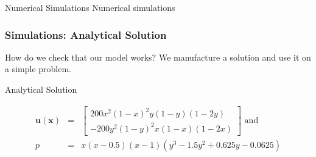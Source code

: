 \documentclass{beamer}
\theoremstyle{definition}
\begin{document}
  \begin{frame}{Numerical Simulations}
  \centering
  \huge{Numerical simulations}
  \end{frame}
 \begin{frame}
 \frametitle{Simulations: Analytical Solution}
 \begin{block}{How do we check that our model works?}
We manufacture a solution and use it on a simple problem.
 \end{block}
 \begin{block}{Analytical Solution}
 	
 	 \begin{eqnarray}
 	\label{benchmark_u}
 	\textbf{u}\left(\textbf{x}\right)&=&\begin{bmatrix}
 	200x^2\left(1-x\right)^2y\left(1-y\right)\left(1-2y\right)  \\
 	-200y^2\left(1-y\right)^2x\left(1-x\right)\left(1-2x\right)  
 	\end{bmatrix} \text{ and}\\\label{benchmark_p}
 	p &=& x\left(x-0.5\right)\left(x-1\right)\left(y^3-1.5y^2+0.625y-0.0625\right)
 	\end{eqnarray}
 \end{block}
\end{frame}
\end{document}
